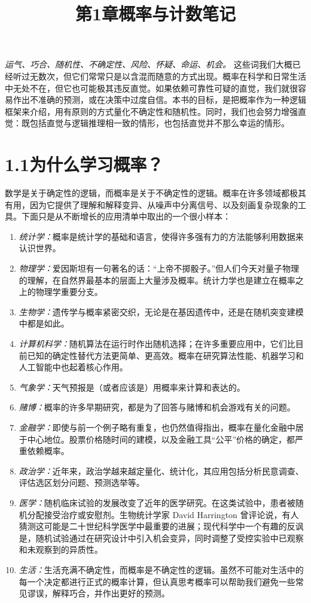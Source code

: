 \documentclass[UTF8,12pt,a4paper,fontset=fandol]{ctexart}
\title{第1章\quad 概率与计数笔记}
\author{}
\date{}
\begin{document}
\maketitle

\noindent\textit{运气、巧合、随机性、不确定性、风险、怀疑、命运、机会。}
这些词我们大概已经听过无数次，但它们常常只是以含混而随意的方式出现。概率在科学和日常生活中无处不在，但它也可能极其违反直觉。如果依赖可靠性可疑的直觉，我们就很容易作出不准确的预测，或在决策中过度自信。本书的目标，是把概率作为一种逻辑框架来介绍，用有原则的方式量化不确定性和随机性。同时，我们也会努力增强直觉：既包括直觉与逻辑推理相一致的情形，也包括直觉并不那么幸运的情形。

\section*{1.1\quad 为什么学习概率？}

数学是关于确定性的逻辑，而概率是关于不确定性的逻辑。概率在许多领域都极其有用，因为它提供了理解和解释变异、从噪声中分离信号、以及刻画复杂现象的工具。下面只是从不断增长的应用清单中取出的一个很小样本：

\begin{enumerate}
  \item \textit{统计学：}概率是统计学的基础和语言，使得许多强有力的方法能够利用数据来认识世界。
  \item \textit{物理学：}爱因斯坦有一句著名的话：“上帝不掷骰子。”但人们今天对量子物理的理解，在自然界最基本的层面上大量涉及概率。统计力学也是建立在概率之上的物理学重要分支。
  \item \textit{生物学：}遗传学与概率紧密交织，无论是在基因遗传中，还是在随机突变建模中都是如此。
  \item \textit{计算机科学：}随机算法在运行时作出随机选择；在许多重要应用中，它们比目前已知的确定性替代方法更简单、更高效。概率在研究算法性能、机器学习和人工智能中也起着核心作用。
  \item \textit{气象学：}天气预报是（或者应该是）用概率来计算和表达的。
  \item \textit{赌博：}概率的许多早期研究，都是为了回答与赌博和机会游戏有关的问题。
  \item \textit{金融学：}即使与前一个例子略有重复，也仍然值得指出，概率在量化金融中居于中心地位。股票价格随时间的建模，以及金融工具“公平”价格的确定，都严重依赖概率。
  \item \textit{政治学：}近年来，政治学越来越定量化、统计化，其应用包括分析民意调查、评估选区划分问题、预测选举等。
  \item \textit{医学：}随机临床试验的发展改变了近年的医学研究。在这类试验中，患者被随机分配接受治疗或安慰剂。生物统计学家 David Harrington 曾评论说，有人猜测这可能是二十世纪科学医学中最重要的进展；现代科学中一个有趣的反讽是，随机试验通过在研究设计中引入机会变异，同时调整了受控实验中已观察和未观察到的异质性。
  \item \textit{生活：}生活充满不确定性，而概率是不确定性的逻辑。虽然不可能对生活中的每一个决定都进行正式的概率计算，但认真思考概率可以帮助我们避免一些常见谬误，解释巧合，并作出更好的预测。
\end{enumerate}
\end{document}
